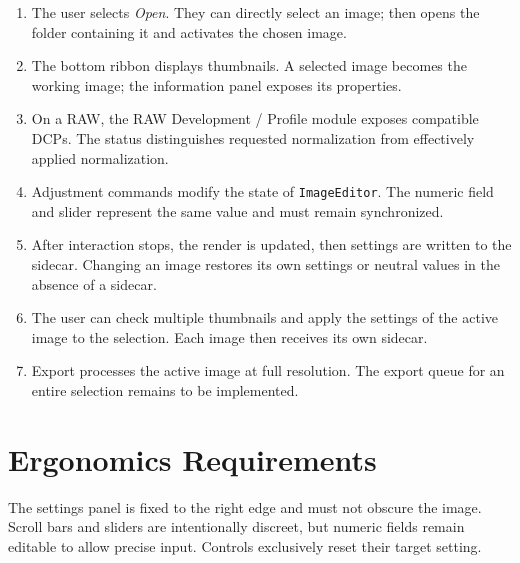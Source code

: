 \begin{enumerate}
  \item The user selects \emph{Open}. They can directly select an image; \IPR{} then opens the folder containing it and activates the chosen image.
  \item The bottom ribbon displays thumbnails. A selected image becomes the working image; the information panel exposes its properties.
  \item On a RAW, the RAW Development / Profile module exposes compatible DCPs. The status distinguishes requested normalization from effectively applied normalization.
  \item Adjustment commands modify the state of \texttt{ImageEditor}. The numeric field and slider represent the same value and must remain synchronized.
  \item After interaction stops, the render is updated, then settings are written to the sidecar. Changing an image restores its own settings or neutral values in the absence of a sidecar.
  \item The user can check multiple thumbnails and apply the settings of the active image to the selection. Each image then receives its own sidecar.
  \item Export processes the active image at full resolution. The export queue for an entire selection remains to be implemented.
\end{enumerate}

\section{Ergonomics Requirements}

The settings panel is fixed to the right edge and must not obscure the image. Scroll bars and sliders are intentionally discreet, but numeric fields remain editable to allow precise input. Controls exclusively reset their target setting.
